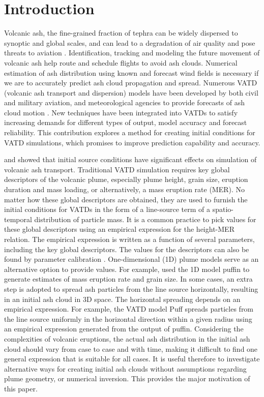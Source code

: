 \documentclass[utf8]{frontiersSCNS} %
\begin{document}
\section{Introduction}
Volcanic ash, the fine-grained fraction of tephra can be widely dispersed to synoptic and global scales, and can lead to a degradation of air quality and pose threats to aviation \citep{tupper2007facing}. Identification, tracking and modeling the future movement of volcanic ash help route and schedule flights to avoid ash clouds. Numerical estimation of ash distribution using known and forecast wind fields is necessary if we are to accurately predict ash cloud propagation and spread. Numerous VATD (volcanic ash transport and dispersion) models have been developed by both civil and military aviation, and meteorological agencies to provide forecasts of ash cloud motion \citep{witham2007comparison}. New techniques have been integrated into VATDs to satisfy increasing demands for different types of output, model accuracy and forecast reliability. This contribution explores a method for creating initial conditions for VATD simulations, which promises to improve prediction capability and accuracy.

\citet{fero2009simulating} and \citet{stohl2011determination} showed that initial source conditions have significant effects on simulation of volcanic ash transport. Traditional VATD simulation requires key global descriptors of the volcanic plume, especially plume height, grain size, eruption duration and mass loading, or alternatively, a mass eruption rate (MER). No matter how these global descriptors are obtained, they are used to furnish the initial conditions for VATDs in the form of a line-source term of a spatio-temporal distribution of particle mass. It is a common practice to pick values for these global descriptors using an empirical expression for the height-MER relation. The empirical expression is written as a function of several parameters, including the key global descriptors. The values for the descriptors can also be found by parameter calibration \citep[e.g.][]{fero2008simulation,fero2009simulating, stohl2011determination, zidikheri2017estimation}. One-dimensional (1D) plume models serve as an alternative option to provide values. For example, \citet{bursik2012estimation} used the 1D model puffin \citep{bursik2001effect} to generate estimates of mass eruption rate and grain size. In some cases, an extra step is adopted to spread ash particles from the line source horizontally, resulting in an initial ash cloud in 3D space. The horizontal spreading depends on an empirical expression. For example, the VATD model Puff spreads particles from the line source uniformly in the horizontal direction within a given radius using an empirical expression generated from the output of puffin. Considering the complexities of volcanic eruptions, the actual ash distribution in the initial ash cloud should vary from case to case and with time, making it difficult to find one general expression that is suitable for all cases. It is useful therefore to investigate alternative ways for creating initial ash clouds without assumptions regarding plume geometry, or numerical inversion. This provides the major motivation of this paper.
\end{document}
